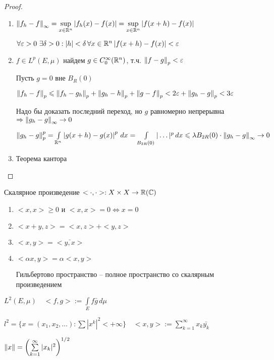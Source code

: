 \begin{proof}\thmslashn
	
	\begin{enumerate}
	\item 
	$\left\|f_h - f\right\|_\infty  = \sup\limits_{x \in \mathbb{R}^n} \left|f_h(x) - f(x)\right| = \sup\limits_{x \in \mathbb{R}^n} \left|f(x+ h) - f(x)\right|$
	
	$\forall \varepsilon > 0\,\, \exists \delta > 0: |h| < \delta\,\forall x \in \mathbb{R}^n\, |f(x+h) - f(x)| < \varepsilon$
	
	\item
	$f\in L^p(E, \mu)$ найдем $g \in C_0^\infty(\mathbb{R}^n)$, т.ч. $\left\|f - g\right\|_p < \varepsilon$
	
	Пусть $g = 0$ вне $B_R(0)$
	
	$\left\|f_h - f\right\|_p \leqslant \left\|f_h - g_h\right\|_p + \left\|g_h - h\right\|_p + \left\|g - f\right\|_p < 2\varepsilon + \left\|g_h - g\right\|_p < 3\varepsilon$ 
	
	Надо бы доказать последний переход, но $g$ равномерно непрерывна $\Rightarrow \left\|g_h - g\right\|_{\infty} \to 0$
	
	$\left\|g_h - g\right\|^p_p = \int\limits_{\mathbb{R}^n}\left|g(x + h) - g(x)\right|^p\,dx = \int\limits_{B_{2R}(0)}|\ldots|^p\,dx \leqslant \lambda B_{2R}(0) \cdot \left\|g_h - g\right\|_\infty \to 0$
	
	
	\item
	Теорема кантора
	
	\end{enumerate}
	
\end{proof}

\begin{definition}\thmslashn
	
	Скалярное произведение $<\cdot, \cdot>: X\times X \to \mathbb{R}(\mathbb{C})$
	
	\begin{enumerate}
		\item 
		$<x, x> \geqslant 0$ и $<x, x> = 0 \Leftrightarrow x = 0$
		
		\item 
		$<x+y, z> = <x, z> + <y, z>$
		
		\item
		$<x, y> = \bar{<y, x>}$
		
		\item
		$<\alpha x, y> = \alpha<x, y>$
		
		Гильбертово пространство -- полное пространство со скалярным произведением
		
	\end{enumerate}
	
\end{definition}

\begin{example}\thmslashn
	
	$L^2(E, \mu) \quad <f, g> := \int\limits_{E} f\bar{g}\,d\mu$
	
	$l^2 = \{x = (x_1, x_2, \ldots): \sum |x^k|^2 < +\infty\} \quad <x, y> := \sum_{k = 1}^{\infty} x_k\bar{y_k}$
	
	$\left\|x\right\| = \left( \sum\limits_{k = 1}^\infty |x_k|^2 \right)^{1/2}$
	
\end{example}